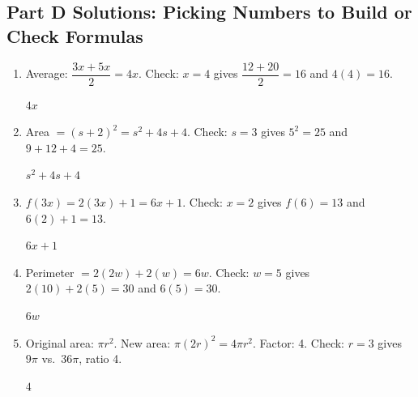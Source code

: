\documentclass[14pt]{extarticle}
\begin{document}
\subsection*{Part D Solutions: Picking Numbers to Build or Check Formulas}
\begin{enumerate}
  \item Average: \(\dfrac{3x + 5x}{2} = 4x\). Check: \(x = 4\) gives \(\dfrac{12 + 20}{2} = 16\) and \(4(4) = 16\).

  \(\boxed{4x}\)

  \item Area \(= (s + 2)^2 = s^2 + 4s + 4\). Check: \(s = 3\) gives \(5^2 = 25\) and \(9 + 12 + 4 = 25\).

  \(\boxed{s^2 + 4s + 4}\)

  \item \(f(3x) = 2(3x) + 1 = 6x + 1\). Check: \(x = 2\) gives \(f(6) = 13\) and \(6(2) + 1 = 13\).

  \(\boxed{6x + 1}\)

  \item Perimeter \(= 2(2w) + 2(w) = 6w\). Check: \(w = 5\) gives \(2(10) + 2(5) = 30\) and \(6(5) = 30\).

  \(\boxed{6w}\)

  \item Original area: \(\pi r^2\). New area: \(\pi(2r)^2 = 4\pi r^2\). Factor: 4. Check: \(r = 3\) gives \(9\pi\) vs.\ \(36\pi\), ratio 4.

  \(\boxed{4}\)
\end{enumerate}
\end{document}
